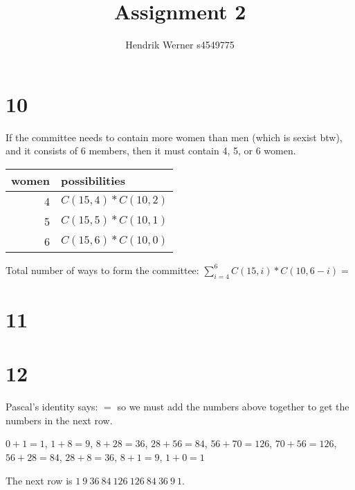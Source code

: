\documentclass[12pt]{article}
\title{Assignment 2}
\author{
	Hendrik Werner s4549775
}
\begin{document}
\maketitle

\section*{10}
If the committee needs to contain more women than men (which is sexist btw), and it consists of 6 members, then it must contain 4, 5, or 6 women.

\begin{tabular}{r|l}
	women & possibilities\\\hline
	4 & $C(15, 4) * C(10, 2)$\\
	5 & $C(15, 5) * C(10, 1)$\\
	6 & $C(15, 6) * C(10, 0)$
\end{tabular}

Total number of ways to form the committee: $\sum_{i=4}^{6} C(15, i) * C(10, 6 - i) = $

\section*{11}

\section*{12}
Pascal's identity says: $=$ so we must add the numbers above together to get the numbers in the next row.

$0 + 1 = 1$, $1 + 8 = 9$, $8 + 28 = 36$, $28 + 56 = 84$, $56 + 70 = 126$, $70 + 56 = 126$, $56 + 28 = 84$, $28 + 8 = 36$, $8 + 1 = 9$, $1 + 0 = 1$

The next row is $1\ 9\ 36\ 84\ 126\ 126\ 84\ 36\ 9\ 1$.
\end{document}
